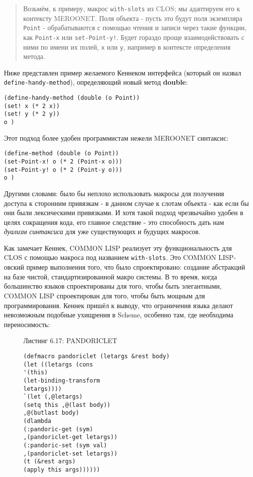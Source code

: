 \begin{quote}Возьмём, к примеру, макрос \verb"with-slots" из CLOS; мы адаптируем его к контексту MEROONET. Поля объекта - пусть это будут поля экземпляра \verb"Point" - обрабатываются с помощью чтения и записи через такие функции, как \verb"Point-x" или \verb"set-Point-y!". Будет гораздо проще взаимодействовать с ними по имени их полей, \verb"x" или \verb"y", например в контексте определения метода.\end{quote}

Ниже представлен пример желаемого Кеннеком интерфейса (который он назвал \verb"define-handy-method"), определяющий новый метод {\Eng\textbf{double}}:

\begin{verbatim}
(define-handy-method (double (o Point))
(set! x (* 2 x))
(set! y (* 2 y))
o )
\end{verbatim}

Этот подход более удобен программистам нежели MEROONET синтаксис:

\begin{verbatim}
(define-method (double (o Point))
(set-Point-x! o (* 2 (Point-x o)))
(set-Point-y! o (* 2 (Point-y o)))
o )
\end{verbatim}

Другими словами: было бы неплохо использовать макросы для получения доступа к сторонним привязкам - в данном случае к слотам объекта - как если бы они были лексическими привязками. И хотя такой подход чрезвычайно удобен в целях сокращения кода, его главное следствие - это способность дать нам \emph{дуализм синтаксиса} для уже существующих и будущих макросов.

Как замечает Кеннек, COMMON LISP реализует эту функциональность для CLOS с помощью макроса под названием \verb"with-slots". Это COMMON LISP-овский пример выполнения того, что было спроектировано: создание абстракций на базе чистой, стандартизированной макро системы. В то время, когда большинство языков спроектированы для того, чтобы быть элегантными, COMMON LISP спроектирован для того, чтобы быть мощным для программирования. Кеннек пришёл к выводу, что ограничения языка делают невозможным подобные ухищрения в Scheme, особенно там, где необходима переносимость:

\begin{figure}Листинг 6.17: PANDORICLET\label{listing_6.17}
\listbegin
\begin{verbatim}
(defmacro pandoriclet (letargs &rest body)
(let ((letargs (cons
'(this)
(let-binding-transform
letargs))))
`(let (,@letargs)
(setq this ,@(last body))
,@(butlast body)
(dlambda
(:pandoric-get (sym)
,(pandoriclet-get letargs))
(:pandoric-set (sym val)
,(pandoriclet-set letargs))
(t (&rest args)
(apply this args))))))
\end{verbatim}
\listend
\end{figure}

